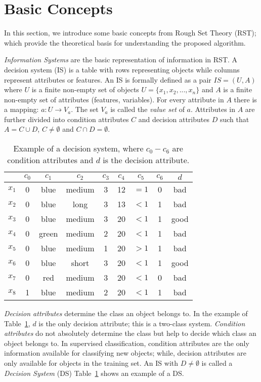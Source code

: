\documentclass[authoryear,preprint,review,12pt]{elsarticle}
\begin{document}
\section{Basic Concepts}\label{basicConcepts}
  In this section, we introduce some basic concepts from Rough Set Theory (RST); which provide the theoretical basis for understanding the proposed algorithm.

  \emph{Information Systems} are the basic representation of information in RST. A decision system (IS) is a table with rows representing objects while columns represent attributes or features. An IS is formally defined as a pair $IS=(U,A)$ where $U$ is a finite non-empty set of objects $U=\lbrace x_1,x_2,...,x_n\rbrace$ and $A$ is a finite non-empty set of attributes (features, variables). For every attribute in $A$ there is a mapping: $a: U \rightarrow V_a$. The set $V_a$ is called the \textit{value set} of $a$. Attributes in $A$ are further divided into condition attributes $C$ and decision attributes $D$ such that $A=C \cup D$, $C \neq \emptyset$ and $C \cap D =\emptyset$. 
  
 \begin{table}[htb]
		\caption{Example of a decision system, where $c_0-c_6$ are condition attributes and $d$ is the decision attribute.} \label{tab_IS}
		\centering
 	\begin{tabular}{c||c|c|c|c|c|c|c||c}
 			  & $c_0$ & $c_1$ & $c_2$ &  $c_3$ & $c_4$ & $c_5$ &  $c_6$ & $d$ \\
 		\hline \hline
		$x_1$ & 0 & blue  & medium & 3 & 12 & $=1$  & 0 & bad   \\
		$x_2$ & 0 & blue  & long   & 3 & 13 & $<1$  & 1 & bad   \\
		$x_3$ & 0 & blue  & medium & 3 & 20 & $<1$  & 1 & good   \\
		$x_4$ & 0 & green & medium & 2 & 20 & $<1$  & 1 & bad   \\
		$x_5$ & 0 & blue  & medium & 1 & 20 & $>1$  & 1 & bad   \\
		$x_6$ & 0 & blue  & short  & 3 & 20 & $<1$  & 1 & good   \\
		$x_7$ & 0 & red   & medium & 3 & 20 & $<1$  & 0 & bad   \\
		$x_8$ & 1 & blue  & medium & 2 & 20 & $<1$  & 1 & bad   \\
 	\end{tabular}             
 \end{table}
 
  \textit{Decision attributes} determine the class an object belongs to. In the example of Table~\ref{tab_IS}, $d$ is the only decision attribute; this is a two-class system. \textit{Condition attributes} do not absolutely determine the class but help to decide which class an object belongs to. In supervised classification, condition attributes are the only information available for classifying new objects; while, decision attributes are only available for objects in the training set. An IS with $D \neq \emptyset$ is called a \textit{Decision System} (DS) Table~\ref{tab_IS} shows an example of a DS.
  
\end{document}
